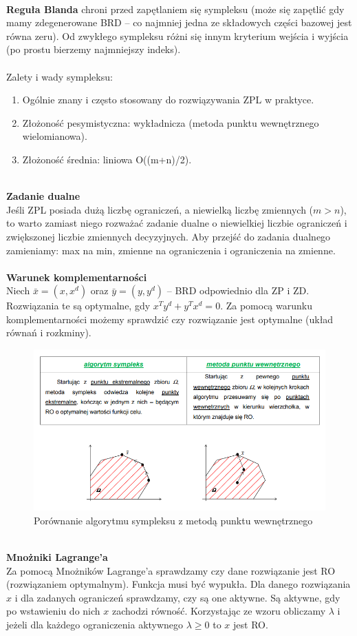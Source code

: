 \documentclass[12pt]{article}
\begin{document}
~\\
\textbf{Reguła Blanda} chroni przed zapętlaniem się sympleksu (może się zapętlić gdy mamy zdegenerowane BRD -- co najmniej jedna ze składowych części bazowej jest równa zeru). Od zwykłego sympleksu różni się innym kryterium wejścia i wyjścia (po prostu bierzemy najmniejszy indeks).\\
~\\
Zalety i wady sympleksu:
\begin{enumerate}
	\item Ogólnie znany i często stosowany do rozwiązywania ZPL w praktyce.
	\item Złożoność pesymistyczna: wykładnicza (metoda punktu wewnętrznego wielomianowa).
	\item Złożoność średnia: liniowa O((m+n)/2).
\end{enumerate}
~\\
\textbf{Zadanie dualne}\\ 
Jeśli ZPL posiada dużą liczbę ograniczeń, a niewielką liczbę zmiennych ($m>n$), to warto zamiast niego rozważać zadanie dualne o niewielkiej liczbie ograniczeń i zwiększonej liczbie zmiennych decyzyjnych. Aby przejść do zadania dualnego zamieniamy: max na min, zmienne na ograniczenia i ograniczenia na zmienne.\\
~\\
\textbf{Warunek komplementarności}\\
Niech $\bar{x} = (x, x^{d})$ oraz $\bar{y} = (y, y^{d})$ -- BRD odpowiednio dla ZP i ZD. Rozwiązania te są optymalne, gdy $x^{T}y^{d} + y^{T}x^{d} = 0$. Za pomocą warunku komplementarności możemy sprawdzić czy rozwiązanie jest optymalne (układ równań i rozkminy).
\begin{figure}[H]
	\centering
	\includegraphics[scale=0.7]{Pictures/sympleks_metodaPunWew}
	\caption{Porównanie algorytmu sympleksu z metodą punktu wewnętrznego}
\end{figure}
~\\
\textbf{Mnożniki Lagrange'a}\\
Za pomocą Mnożników Lagrange'a sprawdzamy czy dane rozwiązanie jest RO (rozwiązaniem optymalnym). Funkcja musi być wypukła. Dla danego rozwiązania $x$ i dla zadanych ograniczeń sprawdzamy, czy są one aktywne. Są aktywne, gdy po wstawieniu do nich $x$ zachodzi równość. Korzystając ze wzoru obliczamy $\lambda$ i jeżeli dla każdego ograniczenia aktywnego $ \lambda \geq 0$ to $x$ jest RO.
\end{document}
